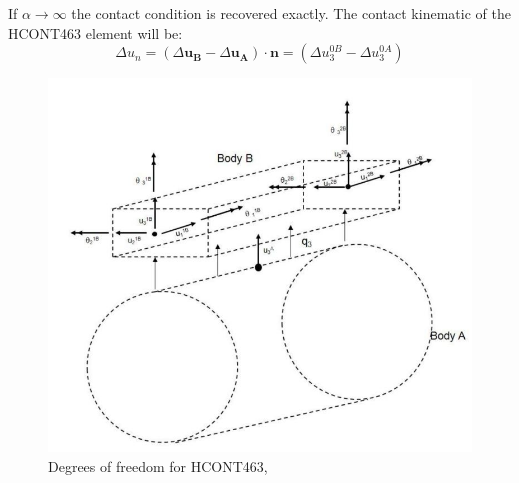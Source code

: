 If $\alpha \rightarrow \infty$ the contact condition is recovered exactly.\newline
\newline 
\noindent The contact kinematic of the HCONT463 element will be:
\begin{equation}
    \Delta u_n= (\Delta \boldsymbol{u_B} - \Delta \boldsymbol{u_A})  \cdot \boldsymbol{n} = (\Delta u_3^{0B} - \Delta u_3^{0A})
\end{equation}
\begin{figure}[H]
\centering
\includegraphics[scale=0.8]{figures/hcont463}
\caption[$\; \:$HCONT463]{Degrees of freedom for HCONT463, \cite{Bflextheory2013} }
 \label{fig:HCONT463}
\end{figure}

